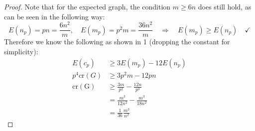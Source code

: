 \documentclass[a4paper,12pt,headsepline]{scrartcl}
\begin{document}
\begin{enumerate}
\begin{proof}
      Note that for the expected graph, the condition $m\ge 6n$ does still hold, as can be seen in the following way:
      \[ E(n_p)=pn=\frac{6n^2}{m}, \quad E(m_p)=p^2m=\frac{36n^2}{m} \quad\Rightarrow\quad E(m_p)\ge E(n_p) \quad \checkmark \]
      Therefore we know the following as shown in 1 (dropping the constant for simplicity):
      \begin{align*}
        E(c_p) &\ge 3E(m_p) - 12E(n_p) \\
        p^4\mathrm{cr}(G) &\ge 3p^2m - 12pn \\
        \mathrm{cr(G)} &\ge \frac{3m}{p^2} - \frac{12n}{p^3} \\
        &= \frac{m^3}{12n^2} - \frac{m^3}{18n^2} \\
        &= \frac{1}{36}\frac{m^3}{n^2}
      \end{align*}
    \end{proof}
\end{enumerate}
\end{document}
